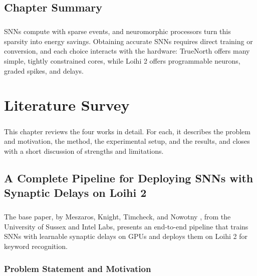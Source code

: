 \documentclass[12pt,a4paper,final]{extreport}
\begin{document}
\section{Chapter Summary}

\paragraph{} SNNs compute with sparse events, and neuromorphic processors turn this sparsity into energy savings. Obtaining accurate SNNs requires direct training or conversion, and each choice interacts with the hardware: TrueNorth offers many simple, tightly constrained cores, while Loihi 2 offers programmable neurons, graded spikes, and delays.

\chapter{Literature Survey}

\paragraph{} This chapter reviews the four works in detail. For each, it describes the problem and motivation, the method, the experimental setup, and the results, and closes with a short discussion of strengths and limitations.

\section{A Complete Pipeline for Deploying SNNs with Synaptic Delays on Loihi 2}

\paragraph{} The base paper, by Meszaros, Knight, Timcheck, and Nowotny \cite{p1}, from the University of Sussex and Intel Labs, presents an end-to-end pipeline that trains SNNs with learnable synaptic delays on GPUs and deploys them on Loihi 2 for keyword recognition.

\subsection{Problem Statement and Motivation}
\end{document}
